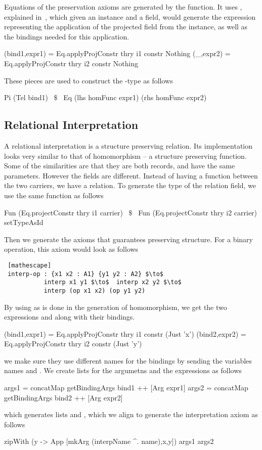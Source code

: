 Equations of the preservation axioms are generated by the  function. It uses , explained in~, which given an instance and a field, would generate the expression representing the application of the projected field from the instance, as well as the bindings needed for this application. 
\begin{hscode} 
(bind1,expr1) = Eq.applyProjConstr thry i1 constr Nothing
     (_,expr2) = Eq.applyProjConstr thry i2 constr Nothing 
\end{hscode} 
These pieces are used to construct the -type as follows 
\begin{hscode}
Pi (Tel bind1) ~$\$$~ Eq (lhs homFunc expr1) (rhs homFunc expr2)
\end{hscode} 

\subsection{Relational Interpretation}
\label{sec:generation:relInterp}
A relational interpretation is a structure preserving relation. Its implementation looks very similar to that of homomorphism -- a structure preserving function. Some of the similarities are that they are both records, and have the same parameters. However the fields are different. Instead of having a function between the two carriers, we have a relation. To generate the type of the relation field, we use the same function  as follows 
\begin{hscode} 
Fun (Eq.projectConstr thry i1 carrier) ~$\$$~ 
     Fun (Eq.projectConstr thry i2 carrier) setTypeAsId
\end{hscode} 
Then we generate the axioms that guarantees preserving structure. For a binary operation, this axiom would look as follows 
\begin{lstlisting} [mathescape]
 interp-op : {x1 x2 : A1} {y1 y2 : A2} $\to$ 
           interp x1 y1 $\to$  interp x2 y2 $\to$ 
           interp (op x1 x2) (op y1 y2)
\end{lstlisting}
By using  as is done in the generation of homomorphism, we get the two expressions  and  along with their bindings. 
\begin{hscode}  
 (bind1,expr1) = Eq.applyProjConstr thry i1 constr (Just 'x')
 (bind2,expr2) = Eq.applyProjConstr thry i2 constr (Just 'y')
\end{hscode} 
we make sure they use different names for the bindings by sending the variables names  and . 
We create lists for the argumetns and the expressions as follows 
\begin{hscode} 
 args1 = concatMap getBindingArgs bind1 ++ [Arg expr1] 
 args2 = concatMap getBindingArgs bind2 ++ [Arg expr2]
\end{hscode} 
which generates lists \lstmath{[x1,x2,op x1 x2]} and \lstmath{[y1,y2,op y1 y2]}, which we align to generate the interpretation axiom as follows 
\begin{hscode} 
 zipWith (\x y -> App [mkArg (interpName ^. name),x,y]) args1 args2 
\end{hscode}

